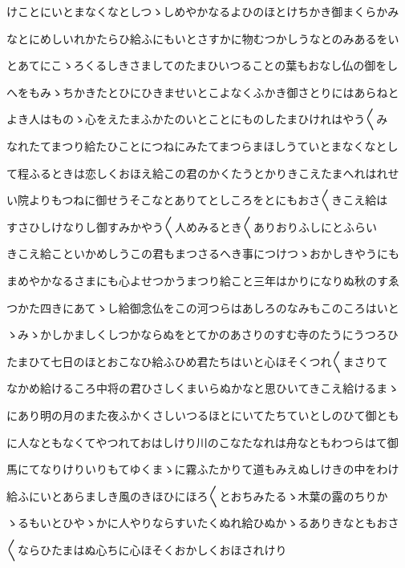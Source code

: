 \documentclass[a4paper,11pt,landscape]{ltjtarticle}
\begin{document}
\par\medskip
けことにいとまなくなとしつゝしめやかなるよひのほとけちかき御まくらかみ
\par\medskip
なとにめしいれかたらひ給ふにもいとさすかに物むつかしうなとのみあるをい
\par\medskip
とあてにこゝろくるしきさましてのたまひいつることの葉もおなし仏の御をし
\par\medskip
へをもみゝちかきたとひにひきませいとこよなくふかき御さとりにはあらねと
\par\medskip
よき人はものゝ心をえたまふかたのいとことにものしたまひけれはやう〱み
\par\medskip
なれたてまつり給たひことにつねにみたてまつらまほしうていとまなくなとし
\par\medskip
て程ふるときは恋しくおほえ給この君のかくたうとかりきこえたまへれはれせ
\par\medskip
い院よりもつねに御せうそこなとありてとしころをとにもおさ〱きこえ給は
\par\medskip
すさひしけなりし御すみかやう〱人めみるとき〱ありおりふしにとふらい
\par\medskip
きこえ給こといかめしうこの君もまつさるへき事につけつゝおかしきやうにも
\par\medskip
まめやかなるさまにも心よせつかうまつり給こと三年はかりになりぬ秋のすゑ
\par\medskip
つかた四きにあてゝし給御念仏をこの河つらはあしろのなみもこのころはいと
\par\medskip
ゝみゝかしかましくしつかならぬをとてかのあさりのすむ寺のたうにうつろひ
\par\medskip
たまひて七日のほとおこなひ給ふひめ君たちはいと心ほそくつれ〱まさりて
\par\medskip
なかめ給けるころ中将の君ひさしくまいらぬかなと思ひいてきこえ給けるまゝ
\par\medskip
にあり明の月のまた夜ふかくさしいつるほとにいてたちていとしのひて御とも
\par\medskip
に人なともなくてやつれておはしけり川のこなたなれは舟なともわつらはて御
\par\medskip
馬にてなりけりいりもてゆくまゝに霧ふたかりて道もみえぬしけきの中をわけ
\par\medskip
給ふにいとあらましき風のきほひにほろ〱とおちみたるゝ木葉の露のちりか
\par\medskip
ゝるもいとひやゝかに人やりならすいたくぬれ給ひぬかゝるありきなともおさ
\par\medskip
〱ならひたまはぬ心ちに心ほそくおかしくおほされけり
\par\medskip
\end{document}

